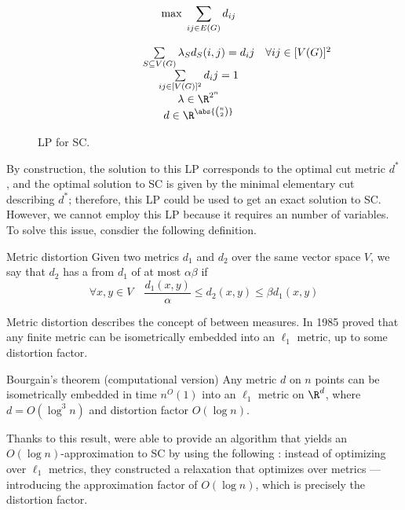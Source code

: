 \documentclass[a4paper, 12pt]{report}
\begin{document}
    \begin{figure}[H]
        \centering
        \[\begin{array}{ccl}
            \qquad\qquad\quad
            & \max \; \displaystyle \sum_{ij \in E(G)}{d_{ij}} \\\\
            & \sum\limits_{S \subseteq V(G)}{\lambda_Sd_S(i, j)}  = d_ij & \forall ij \in [V(G)]^2 \\
            & \sum\limits_{ij \in [V(G)]^2}{d_ij} = 1 \\
            & \lambda \in \R^{2^n} \\
            & d \in \R^{\abs{\binom{n}{2}}} \\
        \end{array}\]
        \caption{LP for SC.}
    \end{figure}

    By construction, the solution to this LP corresponds to the optimal cut metric $d^*$, and the optimal solution to SC is given by the minimal elementary cut describing $d^*$; therefore, this LP could be used to get an exact solution to SC. However, we cannot employ this LP because it requires an  number of variables. To solve this issue, consdier the following definition.

    \begin{frameddefn}{Metric distortion}
        Given two metrics $d_1$ and $d_2$ over the same vector space $V$, we say that $d_2$ has a  from $d_1$ of at most $\alpha \beta$ if $$\forall x, y \in V \quad \dfrac{d_1(x, y)}{\alpha} \le d_2(x, y) \le \beta d_1(x, y)$$
    \end{frameddefn}

    Metric distortion describes the concept of  between measures. In 1985 \textcite{bourgain} proved that any finite metric can be isometrically embedded into an $\ell_1$ metric, up to some distortion factor.

    \begin{framedthm}[label={bourgain}]{Bourgain's theorem (computational version)}
        Any metric $d$ on $n$ points can be isometrically embedded in time $n^O(1)$ into an $\ell_1$ metric on $\R^d$, where $d = O(\log^3 n)$ and distortion factor $O(\log n)$.
    \end{framedthm}

    Thanks to this result, \textcite{leightonrao} were able to provide an algorithm that yields an $O(\log n)$-approximation to SC by using the following : instead of optimizing over $\ell_1$ metrics, they constructed a relaxation that optimizes over  metrics --- introducing the approximation factor of $O(\log n)$, which is precisely the distortion factor.
\end{document}
